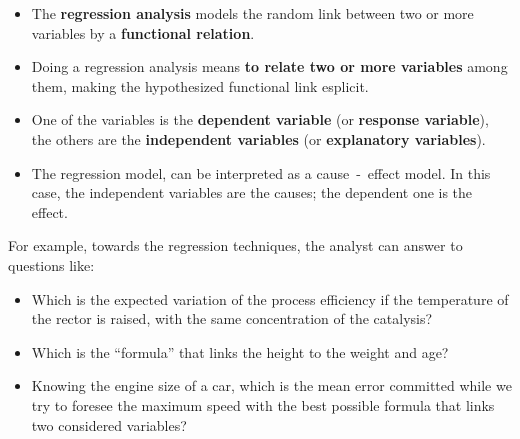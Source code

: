 

\begin{frame}
  \vspace*{.35cm}
  \begin{itemize}
    \item The \textbf{regression analysis} models the random link between two or more variables by a \textbf{functional relation}.
    \vspace*{.7cm}
    \item Doing a regression analysis means \textbf{to relate two or more variables} among them, making the hypothesized functional link esplicit.
    \vspace*{.7cm}
    \item One of the variables is the \textbf{dependent variable} (or \textbf{response variable}), the others are the \textbf{independent variables} (or \textbf{explanatory variables}). 
    \vspace*{.7cm}
    \item The regression model, can be interpreted as a cause~-~effect model. In this case, the independent variables are the causes; the dependent one is the effect.
  \end{itemize}
\end{frame}

\begin{frame}
  For example, towards the regression techniques, the analyst can answer to questions like:
  \vspace{.5cm}
  \begin{itemize}
    \item Which is the expected variation of the process efficiency if the temperature of the rector is raised, with the same concentration of the catalysis?
    \vspace{.5cm}
    \item Which is the ``formula'' that links the height to the weight and age?
    \vspace{.5cm}
    \item Knowing the engine size of a car, which is the mean error committed while we try to foresee the maximum speed with the best possible formula that links two considered variables?
  \end{itemize}
\end{frame}

